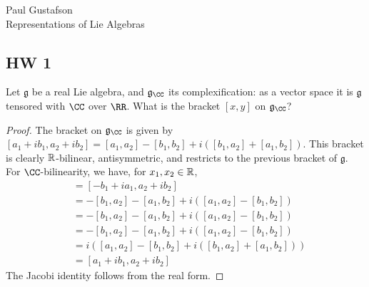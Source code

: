 \documentclass{article}
\newcommand{\mf}{\mathfrak}
\begin{document}
\noindent Paul Gustafson\\
\noindent Representations of Lie Algebras


\subsection*{HW 1}
 Let $\mf g$ be a real Lie algebra, and $\mf g_{\CC}$ its complexification: as a vector space it is $\mf g$ tensored with $\CC$ over $\RR$.  What is the bracket $[x,y]$ on $\mf g_{\CC}$?  
\begin{proof}
The bracket on $\mf g_{\CC}$ is given by $[a_1 + i b_1, a_2 + i b_2] = [a_1, a_2] - [b_1, b_2] + i([b_1,a_2] + [a_1, b_2])$.  This bracket is clearly $\mathbb{R}$-bilinear, antisymmetric, and restricts to the previous bracket of $\mf g$.  For $\CC$-bilinearity, we have, for $x_1,x_2 \in \mathbb{R}$,
\begin{align*}
[i (a_1 + i b_1), a_2 + i b_2] & = [- b_1 + ia_1, a_2 + i b_2] \\
& = -[b_1, a_2] - [a_1, b_2] + i( [a_1,a_2] - [b_1, b_2]) \\
& = -[b_1, a_2] - [a_1, b_2] + i( [a_1,a_2] - [b_1, b_2]) \\
& = -[b_1, a_2] - [a_1, b_2] + i( [a_1,a_2] - [b_1, b_2]) \\
& = i ([a_1, a_2] - [b_1, b_2] + i([b_1,a_2] + [a_1, b_2])) \\
& = [a_1 + i b_1, a_2 + i b_2]
\end{align*}
The Jacobi identity follows from the real form.
\end{proof}
\end{document}
